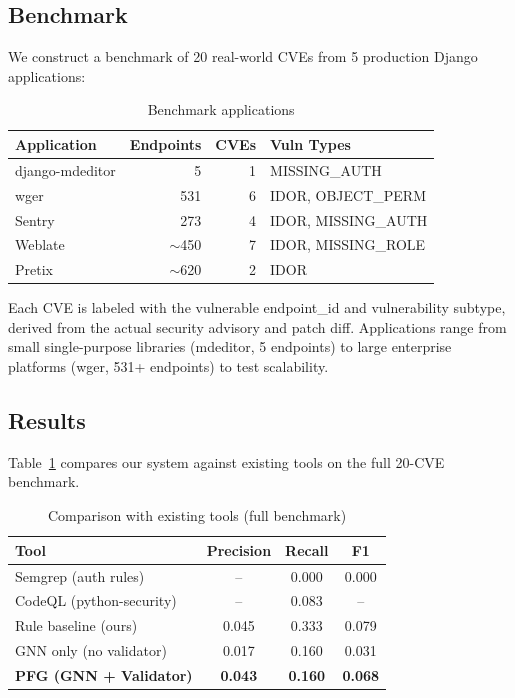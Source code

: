 \documentclass[conference]{IEEEtran}
\begin{document}
\subsection{Benchmark}

We construct a benchmark of 20 real-world CVEs from 5 production Django applications:

\begin{table}[h]
\centering
\caption{Benchmark applications}
\begin{tabular}{lrrl}
\toprule
\textbf{Application} & \textbf{Endpoints} & \textbf{CVEs} & \textbf{Vuln Types} \\
\midrule
django-mdeditor & 5 & 1 & MISSING\_AUTH \\
wger & 531 & 6 & IDOR, OBJECT\_PERM \\
Sentry & 273 & 4 & IDOR, MISSING\_AUTH \\
Weblate & $\sim$450 & 7 & IDOR, MISSING\_ROLE \\
Pretix & $\sim$620 & 2 & IDOR \\
\bottomrule
\end{tabular}
\end{table}

Each CVE is labeled with the vulnerable endpoint\_id and vulnerability subtype, derived from the actual security advisory and patch diff. Applications range from small single-purpose libraries (mdeditor, 5 endpoints) to large enterprise platforms (wger, 531+ endpoints) to test scalability.

\subsection{Results}

Table~\ref{tab:comparison} compares our system against existing tools on the full 20-CVE benchmark.

\begin{table}[h]
\centering
\caption{Comparison with existing tools (full benchmark)}
\label{tab:comparison}
\begin{tabular}{lccc}
\toprule
\textbf{Tool} & \textbf{Precision} & \textbf{Recall} & \textbf{F1} \\
\midrule
Semgrep (auth rules) & -- & 0.000 & 0.000 \\
CodeQL (python-security) & -- & 0.083 & -- \\
Rule baseline (ours) & 0.045 & 0.333 & 0.079 \\
GNN only (no validator) & 0.017 & 0.160 & 0.031 \\
\textbf{PFG (GNN + Validator)} & \textbf{0.043} & \textbf{0.160} & \textbf{0.068} \\
\bottomrule
\end{tabular}
\end{table}
\end{document}

